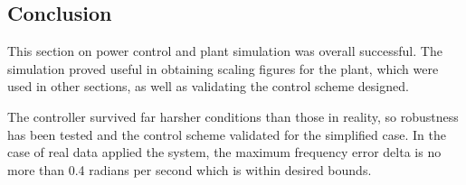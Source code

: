 \subsection{Conclusion}

This section on power control and plant simulation was overall successful.
The simulation proved useful in obtaining scaling figures for the plant, which were used in other sections, as well as validating the control scheme designed.

The controller survived far harsher conditions than those in reality, so robustness has been tested and the control scheme validated for the simplified case.
In the case of real data applied the system, the maximum frequency error delta is no more than 0.4 radians per second which is within desired bounds.
